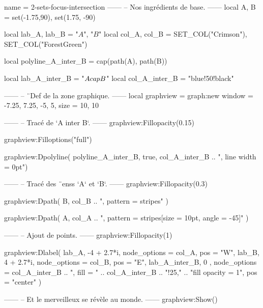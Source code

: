 \documentclass{standalone}
\begin{document}
\begin{luadraw}{name = 2-sets-focus-intersection}
------
-- Nos ingrédients de base.
------
local A, B = set(-1.75,90), set(1.75, -90)

local lab_A, lab_B = "$A$", "$B$"
local col_A, col_B = SET_COL("Crimson"), SET_COL("ForestGreen")

local polyline_A_inter_B = cap(path(A), path(B))

local lab_A_inter_B       = "$A \\cap B$"
local col_A_inter_B       = "blue!50!black"

------
-- ¨Def de la zone graphique.
------
local graphview = graph:new{
  window = {-7.25, 7.25, -5, 5},
  size   = {10, 10}
}

------
-- Tracé de `A inter B`.
------
graphview:Fillopacity(0.15)

graphview:Filloptions("full")

graphview:Dpolyline(
  polyline_A_inter_B,
  true,
  col_A_inter_B .. ", line width = 0pt")

------
-- Tracé des ¨enss `A` et `B`.
------
graphview:Fillopacity(0.3)

graphview:Dpath(
  B,
  col_B .. ", pattern = stripes"
)

graphview:Dpath(
  A,
  col_A .. ", pattern = {stripes[size = 10pt, angle = -45]}"
)


------
-- Ajout de points.
------
graphview:Fillopacity(1)

graphview:Dlabel(
  lab_A, -4 + 2.7*i, {node_options = col_A, pos = "W"},
  lab_B, 4 + 2.7*i, {node_options = col_B, pos = "E"},
  lab_A_inter_B, 0 , {
    node_options = col_A_inter_B
                .. ", fill = " .. col_A_inter_B .. "!25,"
                .. "fill opacity = 1",
    pos = "center"
  })

------
-- Et le merveilleux se révèle au monde.
------
graphview:Show()
\end{luadraw}
\end{document}
